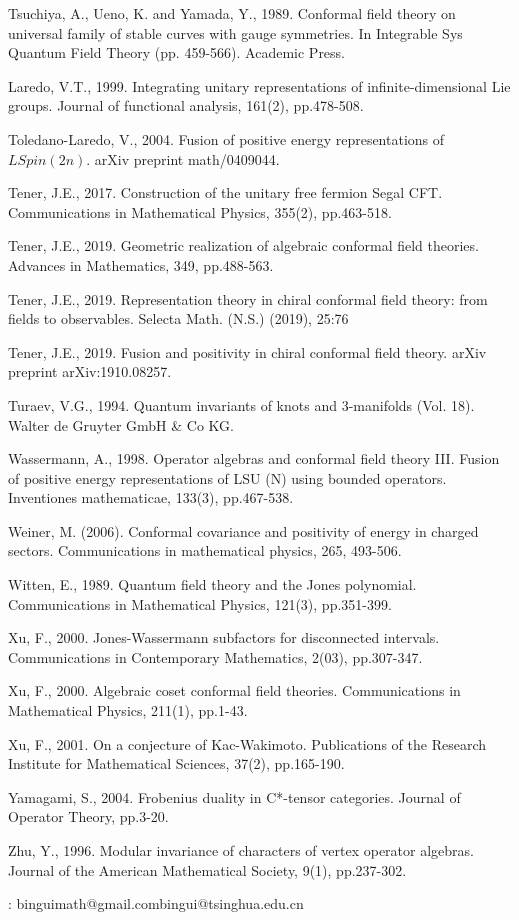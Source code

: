 \documentclass[12pt,a4paper]{article}
\theoremstyle{definition}
\theoremstyle{plain}
\numberwithin{equation}{subsection}
\begin{document}
\begin{thebibliography}{999999}
Tsuchiya, A., Ueno, K. and Yamada, Y., 1989. Conformal field theory on universal family of stable curves with gauge symmetries. In Integrable Sys Quantum Field Theory (pp. 459-566). Academic Press.

Laredo, V.T., 1999. Integrating unitary representations of infinite-dimensional Lie groups. Journal of functional analysis, 161(2), pp.478-508.

Toledano-Laredo, V., 2004. Fusion of positive energy representations of $LSpin(2n)$. arXiv preprint math/0409044.

Tener, J.E., 2017. Construction of the unitary free fermion Segal CFT. Communications in Mathematical Physics, 355(2), pp.463-518.



Tener, J.E., 2019. Geometric realization of algebraic conformal field theories. Advances in Mathematics, 349, pp.488-563.


Tener, J.E., 2019. Representation theory in chiral conformal field theory: from fields to
observables. Selecta Math. (N.S.) (2019), 25:76

Tener, J.E., 2019. Fusion and positivity in chiral conformal field theory. arXiv preprint arXiv:1910.08257.



Turaev, V.G., 1994. Quantum invariants of knots and 3-manifolds (Vol. 18). Walter de Gruyter GmbH \& Co KG.

Wassermann, A., 1998. Operator algebras and conformal field theory III. Fusion of positive energy representations of LSU (N) using bounded operators. Inventiones mathematicae, 133(3), pp.467-538.

Weiner, M. (2006). Conformal covariance and positivity of energy in charged sectors. Communications in mathematical physics, 265, 493-506.

Witten, E., 1989. Quantum field theory and the Jones polynomial. Communications in Mathematical Physics, 121(3), pp.351-399.

Xu, F., 2000. Jones-Wassermann subfactors for disconnected intervals. Communications in Contemporary Mathematics, 2(03), pp.307-347.

Xu, F., 2000. Algebraic coset conformal field theories. Communications in Mathematical Physics, 211(1), pp.1-43.

Xu, F., 2001. On a conjecture of Kac-Wakimoto. Publications of the Research Institute for Mathematical Sciences, 37(2), pp.165-190.

Yamagami, S., 2004. Frobenius duality in C*-tensor categories. Journal of Operator Theory, pp.3-20.

Zhu, Y., 1996. Modular invariance of characters of vertex operator algebras. Journal of the American Mathematical Society, 9(1), pp.237-302.


	
\end{thebibliography}

: binguimath@gmail.com\qquad bingui@tsinghua.edu.cn
\end{document}
